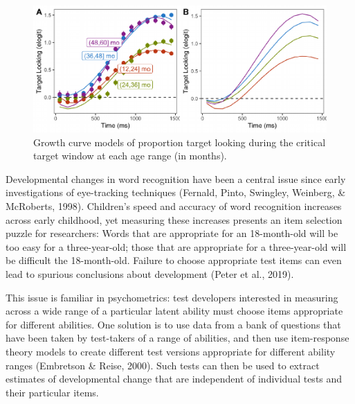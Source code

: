 \documentclass[10pt, letterpaper]{article}
\newenvironment{CodeChunk}{}{}
\begin{document}
\begin{CodeChunk}
\begin{figure}[h]

{\centering \includegraphics{figs/age_gca-1} 

}

\caption[Growth curve models of proportion target looking during the critical target window at each age range (in months)]{Growth curve models of proportion target looking during the critical target window at each age range (in months).}\label{fig:age_gca}
\end{figure}
\end{CodeChunk}

Developmental changes in word recognition have been a central issue
since early investigations of eye-tracking techniques (Fernald, Pinto,
Swingley, Weinberg, \& McRoberts, 1998). Children's speed and accuracy
of word recognition increases across early childhood, yet measuring
these increases presents an item selection puzzle for researchers: Words
that are appropriate for an 18-month-old will be too easy for a
three-year-old; those that are appropriate for a three-year-old will be
difficult the 18-month-old. Failure to choose appropriate test items can
even lead to spurious conclusions about development (Peter et al.,
2019).

This issue is familiar in psychometrics: test developers interested in
measuring across a wide range of a particular latent ability must choose
items appropriate for different abilities. One solution is to use data
from a bank of questions that have been taken by test-takers of a range
of abilities, and then use item-response theory models to create
different test versions appropriate for different ability ranges
(Embretson \& Reise, 2000). Such tests can then be used to extract
estimates of developmental change that are independent of individual
tests and their particular items.
\end{document}
